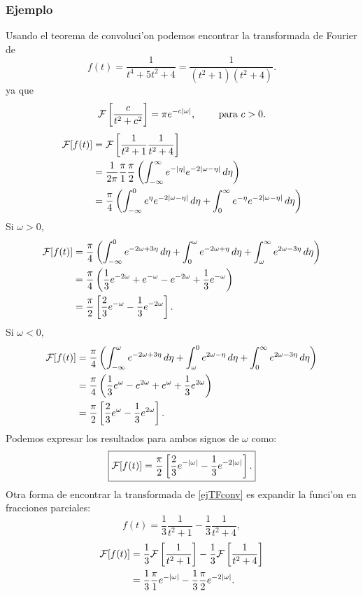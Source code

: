 \subsubsection{Ejemplo} Usando el teorema de convoluci'on podemos encontrar la transformada de Fourier de 
\begin{equation}\label{ejTFconv}
 f(t) =\frac{1}{t^4 + 5 t^2 + 4} = \frac{1}{(t^2+1)(t^2+4)}.
\end{equation}
ya que
\begin{equation}
{\cal F}\left[\frac{c}{t^2+c^2}\right] = \pi e^{-c |\omega|},\qquad\text{ para }c > 0. 
\end{equation}
\begin{align}
{\cal F}[f(t)]
 &={\cal F}\left[\frac{1}{t^2+1}\frac{1}{t^2+4}\right] 
\\
 &=\frac{1}{2\pi}\frac{\pi}{1}\frac{\pi}{2}\left(\int_{-\infty}^\infty e^{-|\eta|} e^{-2|\omega -\eta|}\,d\eta\right) 
\\
 &=\frac{\pi}{4}\left(\int_{-\infty}^0 e^\eta e^{-2|\omega -\eta|}\,d\eta
 +\int_0^\infty e^{-\eta} e^{-2|\omega -\eta|}\,d\eta\right)
\end{align}
Si $\omega > 0$,
\begin{align}
{\cal F}[f(t)]
 &=\frac{\pi}{4}\left(\int_{-\infty}^0 e^{-2\omega + 3\eta}\,d\eta
 +\int_0^\omega e^{-2\omega +\eta}\,d\eta
 +\int_\omega^\infty e^{2\omega - 3\eta}\,d\eta\right) 
\\
 &=\frac{\pi}{4}\left(\frac{1}{3} e^{-2\omega} + e^{-\omega}
 - e^{-2\omega} +\frac{1}{3} e^{-\omega}\right) 
\\
 &=\frac{\pi}{2}\left[ \frac{2}{3}e^{-\omega} -\frac{1}{3} e^{-2\omega}\right].
\end{align}
Si $\omega < 0$,
\begin{align}
{\cal F}[f(t)]
 &=\frac{\pi}{4}\left(\int_{-\infty}^\omega e^{-2\omega+3\eta}\,d\eta
 +\int_\omega^0 e^{2\omega -\eta}\,d\eta
 +\int_0^\infty e^{2\omega-3\eta}\,d\eta\right) 
\\
 &=\frac{\pi}{4}\left(\frac{1}{3} e^\omega - e^{2\omega}
 + e^\omega +\frac{1}{3} e^{2\omega}\right)\\
 &=\frac{\pi}{2}\left[\frac{2}{3}e^\omega -\frac{1}{3} e^{2\omega} \right].
\end{align}
Podemos expresar los resultados para ambos signos de $\omega$ como:
\begin{equation}
\boxed{ 
{\cal F}[f(t)] =\frac{\pi}{2}\left[\frac{2}{3} e^{-|\omega|} -\frac{1}{3} e^{-2|\omega|} \right].
 } 
\end{equation} 
Otra forma de encontrar la transformada de \eqref{ejTFconv} es expandir la funci'on en fracciones parciales:
\begin{equation}
f(t) =\frac{1}{3}\frac{1}{t^2 + 1} -\frac{1}{3}\frac{1}{t^2 + 4},
\end{equation}
\begin{align}
{\cal F}[f(t)]
&=\frac{1}{3}{\cal F}\left[\frac{1}{t^2 + 1}\right]
-\frac{1}{3}{\cal F}\left[\frac{1}{t^2+4}\right]\\
&=\frac{1}{3}\frac{\pi}{1} e^{-|\omega|} -\frac{1}{3}\frac{\pi}{2} e^{-2|\omega|}.
\end{align}        

